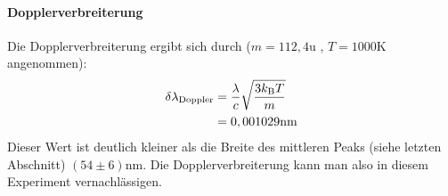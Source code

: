 \paragraph{Dopplerverbreiterung}
Die Dopplerverbreiterung ergibt sich durch ($m = 112,4\si{\atomicmassunit}$ \cite{wiki_cd}, $ T = 1000\si{\kelvin}$ angenommen):
\begin{align*}
\delta \lambda_\mathrm{Doppler} &= \frac{\lambda}{c}\sqrt{\frac{3k_\mathrm{B}T}{m}}\\
&= 0,001029 \si{\nano\meter}
\end{align*}
Dieser Wert ist deutlich kleiner als die Breite des mittleren Peaks (siehe letzten Abschnitt) $(54 \pm 6) \si{\nano\meter}$. Die Dopplerverbreiterung kann man also in diesem Experiment vernachlässigen.
